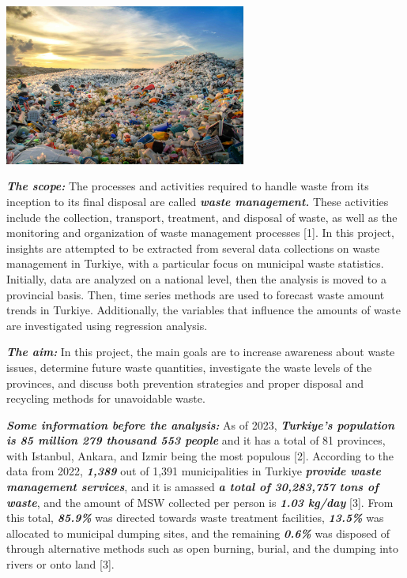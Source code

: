 \documentclass[
  11pt,
  a4paper,
  DIV=11,
  numbers=noendperiod]{scrartcl}
\begin{document}
\begin{center}
\includegraphics[width=3.125in,height=\textheight]{assets/images/landfill-scaled.jpg}
\end{center}

\textbf{\emph{The scope:}} The processes and activities required to
handle waste from its inception to its final disposal are called
\textbf{\emph{waste management.}} These activities include the
collection, transport, treatment, and disposal of waste, as well as the
monitoring and organization of waste management processes {[}1{]}. In
this project, insights are attempted to be extracted from several data
collections on waste management in Turkiye, with a particular focus on
municipal waste statistics. Initially, data are analyzed on a national
level, then the analysis is moved to a provincial basis. Then, time
series methods are used to forecast waste amount trends in Turkiye.
Additionally, the variables that influence the amounts of waste are
investigated using regression analysis.

\textbf{\emph{The aim:}} In this project, the main goals are to increase
awareness about waste issues, determine future waste quantities,
investigate the waste levels of the provinces, and discuss both
prevention strategies and proper disposal and recycling methods for
unavoidable waste.

\textbf{\emph{Some information before the analysis:}} As of 2023,
\textbf{\emph{Turkiye's population is 85 million 279 thousand 553
people}} and it has a total of 81 provinces, with Istanbul, Ankara, and
Izmir being the most populous {[}2{]}. According to the data from 2022,
\textbf{\emph{1,389}} out of 1,391 municipalities in Turkiye
\textbf{\emph{provide waste management services}}, and it is amassed
\textbf{\emph{a total of 30,283,757 tons of waste}}, and the amount of
MSW collected per person is \textbf{\emph{1.03 kg/day}} {[}3{]}. From
this total, \textbf{\emph{85.9\%}} was directed towards waste treatment
facilities, \textbf{\emph{13.5\%}} was allocated to municipal dumping
sites, and the remaining \textbf{\emph{0.6\%}} was disposed of through
alternative methods such as open burning, burial, and the dumping into
rivers or onto land {[}3{]}.
\end{document}
